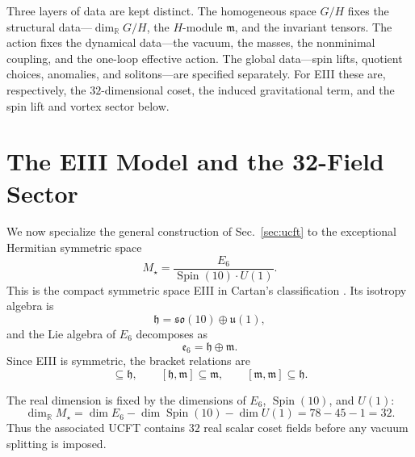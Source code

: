 \documentclass[aps,prd,preprint,longbibliography,nofootinbib,superscriptaddress,floatfix]{revtex4-2}
\newcommand{\Spin}{\operatorname{Spin}}
\begin{document}
Three layers of data are kept distinct. The homogeneous space \(G/H\) fixes the
structural data---\(\dim_{\mathbb R}G/H\), the \(H\)-module \(\mathfrak m\), and
the invariant tensors. The action fixes the dynamical data---the vacuum, the
masses, the nonminimal coupling, and the one-loop effective action. The global
data---spin lifts, quotient choices, anomalies, and solitons---are specified
separately. For EIII these are, respectively, the \(32\)-dimensional coset, the
induced gravitational term, and the spin lift and vortex sector below.


\section{The EIII Model and the 32-Field Sector}
\label{sec:eiii_model}

We now specialize the general construction of Sec.~\ref{sec:ucft} to the
exceptional Hermitian symmetric space
\begin{equation}
    M_\star
    =
    \frac{E_6}{\Spin(10)\cdot U(1)} .
    \label{eq:eiii_target}
\end{equation}
This is the compact symmetric space EIII in Cartan's classification
\cite{Helgason,Besse}. Its isotropy algebra is
\begin{equation}
    \mathfrak h
    =
    \mathfrak{so}(10)\oplus\mathfrak u(1),
    \label{eq:eiii_isotropy_algebra}
\end{equation}
and the Lie algebra of \(E_6\) decomposes as
\begin{equation}
    \mathfrak e_6
    =
    \mathfrak h\oplus\mathfrak m .
    \label{eq:eiii_reductive_decomposition}
\end{equation}
Since EIII is symmetric, the bracket relations are
\begin{equation}
    [\mathfrak h,\mathfrak h]\subseteq\mathfrak h,
    \qquad
    [\mathfrak h,\mathfrak m]\subseteq\mathfrak m,
    \qquad
    [\mathfrak m,\mathfrak m]\subseteq\mathfrak h .
    \label{eq:eiii_symmetric_brackets}
\end{equation}

The real dimension is fixed by the dimensions of \(E_6\), \(\Spin(10)\), and
\(U(1)\):
\begin{equation}
    \dim_{\mathbb R}M_\star
    =
    \dim E_6-\dim\Spin(10)-\dim U(1)
    =
    78-45-1
    =
    32 .
    \label{eq:eiii_dimension}
\end{equation}
Thus the associated UCFT contains \(32\) real scalar coset fields before any
vacuum splitting is imposed.
\end{document}
